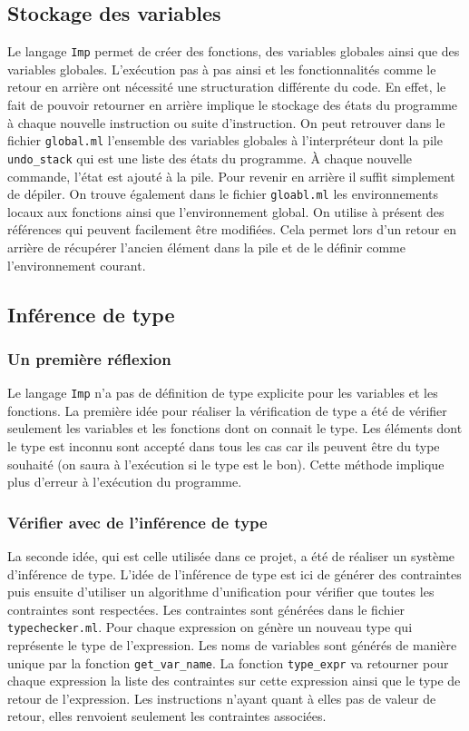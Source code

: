 \documentclass{article}
\begin{document}
\subsection{Stockage des variables}
Le langage \texttt{Imp} permet de créer des fonctions, des variables globales ainsi 
que des variables globales. L'exécution pas à pas ainsi et les fonctionnalités comme 
le retour en arrière ont nécessité une structuration différente du code. En effet, 
le fait de pouvoir retourner en arrière implique le stockage des états du programme 
à chaque nouvelle instruction ou suite d'instruction. On peut retrouver dans le 
fichier \texttt{global.ml} l'ensemble des variables globales à l'interpréteur 
dont la pile \texttt{undo\_stack} qui est une liste des états du programme. À chaque 
nouvelle commande, l'état est ajouté à la pile. Pour revenir en arrière il suffit 
simplement de dépiler. On trouve également dans le fichier \texttt{gloabl.ml} les 
environnements locaux aux fonctions ainsi que l'environnement global. On utilise à 
présent des références qui peuvent facilement être modifiées. Cela permet lors d'un 
retour en arrière de récupérer l'ancien élément dans la pile et de le définir 
comme l'environnement courant.


\subsection{Inférence de type}
\subsubsection{Un première réflexion}
Le langage \texttt{Imp} n'a pas de définition de type explicite pour les variables 
et les fonctions. La première idée pour réaliser la vérification de type a été 
de vérifier seulement les variables et les fonctions dont on connait le type. 
Les éléments dont le type est inconnu sont accepté dans tous les cas car ils 
peuvent être du type souhaité (on saura à l'exécution si le type est le bon). 
Cette méthode implique plus d'erreur à l'exécution du programme.

\subsubsection{Vérifier avec de l'inférence de type}
La seconde idée, qui est celle utilisée dans ce projet, a été de réaliser un 
système d'inférence de type. L'idée de l'inférence de type est ici de 
générer des contraintes puis ensuite d'utiliser un algorithme d'unification 
pour vérifier que toutes les contraintes sont respectées. Les contraintes 
sont générées dans le fichier \texttt{typechecker.ml}.
Pour chaque expression on génère un nouveau type qui représente le type de 
l'expression. Les noms de variables sont générés de manière unique par 
la fonction \texttt{get\_var\_name}. La fonction \texttt{type\_expr} va 
retourner pour chaque expression la liste des contraintes sur cette 
expression ainsi que le type de retour de l'expression. Les instructions 
n'ayant quant à elles pas de valeur de retour, elles renvoient seulement 
les contraintes associées.
\end{document}
